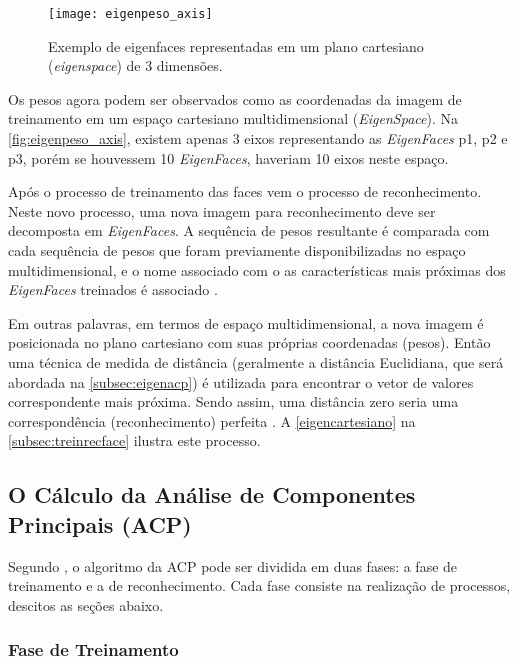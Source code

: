 \begin{figure}[h]
	\centering
	\texttt{[image: eigenpeso\_axis]}
	\caption{Exemplo de eigenfaces representadas em um plano cartesiano (\textit{eigenspace}) de 3 dimensões. }
	\label{fig:eigenpeso_axis}
\end{figure}

Os pesos agora podem ser observados como as coordenadas da imagem de treinamento em um espaço cartesiano multidimensional (\textit{EigenSpace}). Na \autoref{fig:eigenpeso_axis}, existem apenas 3 eixos representando as \textit{EigenFaces} p1, p2 e p3, porém se houvessem 10 \textit{EigenFaces}, haveriam 10 eixos neste espaço.

Após o processo de treinamento das faces vem o processo de reconhecimento. Neste novo processo, uma nova imagem para reconhecimento deve ser decomposta em \textit{EigenFaces}. A sequência de pesos resultante é comparada com cada sequência de pesos que foram previamente disponibilizadas no espaço multidimensional, e o nome associado com o as características mais próximas dos \textit{EigenFaces} treinados é associado \cite{drmathew_java_programming}.

Em outras palavras, em termos de espaço multidimensional, a nova imagem é posicionada no plano cartesiano com suas próprias coordenadas (pesos). Então uma técnica de medida de distância (geralmente a distância Euclidiana, que será abordada na \autoref{subsec:eigenacp}) é utilizada para encontrar o vetor de valores correspondente mais próxima. Sendo assim, uma distância zero seria uma correspondência (reconhecimento) perfeita \cite{drmathew_java_programming}. A \autoref{eigencartesiano} na \autoref{subsec:treinrecface} ilustra este processo.



\subsection{O Cálculo da Análise de Componentes Principais (ACP)}\label{subsec:acp}

Segundo \cite{geysilva}, o algoritmo da ACP pode ser dividida em duas fases: a fase de treinamento e a de reconhecimento. Cada fase consiste na realização de processos, descitos as seções abaixo.

\subsubsection{Fase de Treinamento} \label{subsec:treinamento}

